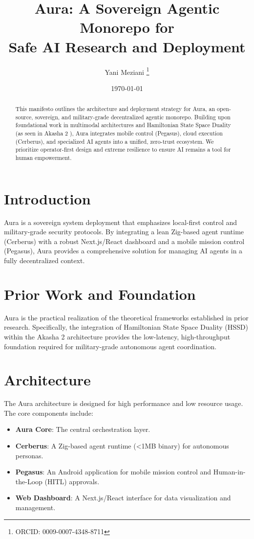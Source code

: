 \documentclass[11pt,a4paper]{article}
\title{Aura: A Sovereign Agentic Monorepo for \\ Safe AI Research and Deployment}
\author[1]{Yani Meziani \thanks{ORCID: 0009-0007-4348-8711}}
\affil[1]{Aura Research Lab (aura.meziani.org)}
\date{\today}
\begin{document}
\maketitle

\begin{abstract}
This manifesto outlines the architecture and deployment strategy for Aura, an open-source, sovereign, and military-grade decentralized agentic monorepo. Building upon foundational work in multimodal architectures and Hamiltonian State Space Duality (as seen in Akasha 2 \cite{meziani2026akasha}), Aura integrates mobile control (Pegasus), cloud execution (Cerberus), and specialized AI agents into a unified, zero-trust ecosystem. We prioritize operator-first design and extreme resilience to ensure AI remains a tool for human empowerment.
\end{abstract}

\section{Introduction}
Aura is a sovereign system deployment that emphasizes local-first control and military-grade security protocols. By integrating a lean Zig-based agent runtime (Cerberus) with a robust Next.js/React dashboard and a mobile mission control (Pegasus), Aura provides a comprehensive solution for managing AI agents in a fully decentralized context.

\section{Prior Work and Foundation}
Aura is the practical realization of the theoretical frameworks established in prior research. Specifically, the integration of Hamiltonian State Space Duality (HSSD) within the Akasha 2 architecture \cite{meziani2026akasha} provides the low-latency, high-throughput foundation required for military-grade autonomous agent coordination.

\section{Architecture}
The Aura architecture is designed for high performance and low resource usage. The core components include:
\begin{itemize}
    \item \textbf{Aura Core}: The central orchestration layer.
    \item \textbf{Cerberus}: A Zig-based agent runtime (<1MB binary) for autonomous personas.
    \item \textbf{Pegasus}: An Android application for mobile mission control and Human-in-the-Loop (HITL) approvals.
    \item \textbf{Web Dashboard}: A Next.js/React interface for data visualization and management.
\end{itemize}
\end{document}
